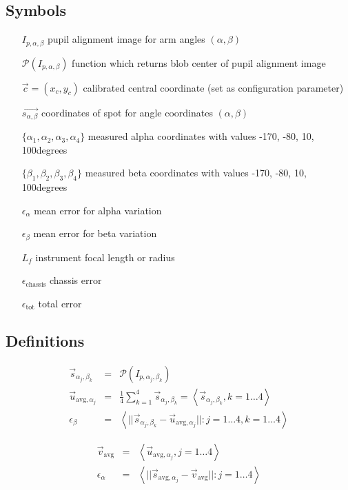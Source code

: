 \documentclass[11pt,a4paper]{scrartcl}
\begin{document}
\subsection{Symbols}
\begin{itemize}
  \item[$I_{p,\alpha,\beta}$] pupil alignment image for arm angles $(\alpha,\beta)$
\item[$\mathcal{P}(I_{p,\alpha,\beta})$] function which returns blob center of pupil alignment image
\item[$\vec{c} = (x_c, y_c)$] calibrated central coordinate (set as configuration parameter)
\item[$\vec{s_{\alpha,\beta}}$]  coordinates of spot for angle coordinates $(\alpha, \beta)$
\item[$\{ \alpha_1, \alpha_2, \alpha_3, \alpha_4\}$] measured alpha coordinates with values -170\degree, -80\degree, 10\degree, 100\degree degrees
\item[$\{ \beta_1, \beta_2, \beta_3, \beta_4\}$] measured beta coordinates  with values -170\degree, -80\degree, 10\degree, 100\degree degrees
\item[$\epsilon_\alpha$] mean error for alpha variation
\item[$\epsilon_\beta$] mean error for beta variation
\item[$L_f$] instrument focal length or radius
\item[$\epsilon_\mathrm{chassis}$] chassis error
\item[$\epsilon_\mathrm{tot}$] total error

\end{itemize}

\subsection{Definitions}
\begin{eqnarray}
  \vec{s}_{\alpha_j,\beta_k} & =  & \mathcal{P}(I_{p,\alpha_j,\beta_k}) \\
  \vec{u}_{\mathrm{avg}, \alpha_j} & = & \frac{1}{4} \sum_{k=1}^{4} \vec{s}_{\alpha_j,\beta_k} = \left<\vec{s}_{\alpha_j,\beta_k}, k = 1 \ldots 4 \right>\\
  \epsilon_\beta & = & \left< ||\vec{s}_{\alpha_j,\beta_k} - \vec{u}_{\mathrm{avg}, \alpha_j} || : j = 1 \ldots 4, k = 1 \ldots 4 \right>
\end{eqnarray}

\begin{eqnarray}
  \vec{v}_\mathrm{avg} & = & \left< \vec{u}_{\mathrm{avg}, \alpha_j}, j = 1 \ldots 4 \right> \\
  \epsilon_\alpha & = & \left< ||\vec{s}_{\mathrm{avg}, \alpha_j} - \vec{v}_\mathrm{avg} || : j = 1 \ldots 4 \right>
\end{eqnarray}
\end{document}
